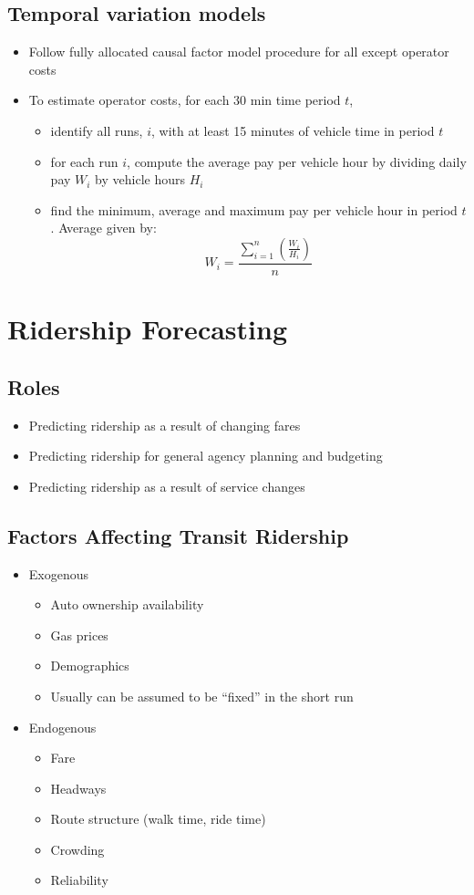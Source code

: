 \documentclass[11pt]{article}
\begin{document}
\subsection{Temporal variation models}
\label{sec:orgecf4dfd}
\begin{itemize}
\item Follow fully allocated causal factor model procedure for all except operator costs
\item To estimate operator costs, for each 30 min time period \(t\),
\begin{itemize}
\item identify all runs, \(i\), with at least 15 minutes of vehicle time in period \(t\)
\item for each run \(i\), compute the average pay per vehicle hour by dividing daily pay \(W_i\) by vehicle hours \(H_i\)
\item find the minimum, average and maximum pay per vehicle hour in period \(t\). Average given by:
\[W_i = \frac{\sum^{n}_{i=1}(\frac{W_i}{H_i})}{n}\]
\end{itemize}
\end{itemize}
\section{Ridership Forecasting}
\label{sec:org0b17a0b}

\subsection{Roles}
\label{sec:orgc1ee267}
\begin{itemize}
\item Predicting ridership as a result of changing fares
\item Predicting ridership for general agency planning and budgeting
\item Predicting ridership as a result of service changes
\end{itemize}
\subsection{Factors Affecting Transit Ridership}
\label{sec:org208bb4a}
\begin{itemize}
\item Exogenous
\begin{itemize}
\item Auto ownership availability
\item Gas prices
\item Demographics
\item Usually can be assumed to be ``fixed'' in the short run
\end{itemize}
\item Endogenous
\begin{itemize}
\item Fare
\item Headways
\item Route structure (walk time, ride time)
\item Crowding
\item Reliability
\end{itemize}
\end{itemize}
\end{document}

